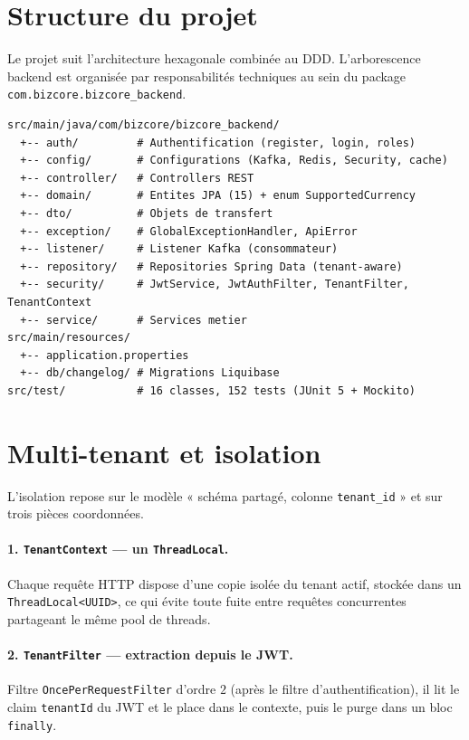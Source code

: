 \section{Structure du projet}

Le projet suit l'architecture hexagonale combinée au DDD. L'arborescence backend est
organisée par responsabilités techniques au sein du package \texttt{com.bizcore.bizcore\_backend}.

\begin{lstlisting}[language={},caption={Structure du projet backend},captionpos=b]
src/main/java/com/bizcore/bizcore_backend/
  +-- auth/         # Authentification (register, login, roles)
  +-- config/       # Configurations (Kafka, Redis, Security, cache)
  +-- controller/   # Controllers REST
  +-- domain/       # Entites JPA (15) + enum SupportedCurrency
  +-- dto/          # Objets de transfert
  +-- exception/    # GlobalExceptionHandler, ApiError
  +-- listener/     # Listener Kafka (consommateur)
  +-- repository/   # Repositories Spring Data (tenant-aware)
  +-- security/     # JwtService, JwtAuthFilter, TenantFilter, TenantContext
  +-- service/      # Services metier
src/main/resources/
  +-- application.properties
  +-- db/changelog/ # Migrations Liquibase
src/test/           # 16 classes, 152 tests (JUnit 5 + Mockito)
\end{lstlisting}

\section{Multi-tenant et isolation}

L'isolation repose sur le modèle « schéma partagé, colonne \texttt{tenant\_id} » et sur
trois pièces coordonnées.

\paragraph{1. \texttt{TenantContext} --- un \texttt{ThreadLocal}.}
Chaque requête HTTP dispose d'une copie isolée du tenant actif, stockée dans un
\texttt{ThreadLocal<UUID>}, ce qui évite toute fuite entre requêtes concurrentes partageant
le même pool de threads.

\paragraph{2. \texttt{TenantFilter} --- extraction depuis le JWT.}
Filtre \texttt{OncePerRequestFilter} d'ordre $2$ (après le filtre d'authentification), il
lit le claim \texttt{tenantId} du JWT et le place dans le contexte, puis le purge dans un
bloc \texttt{finally}.

